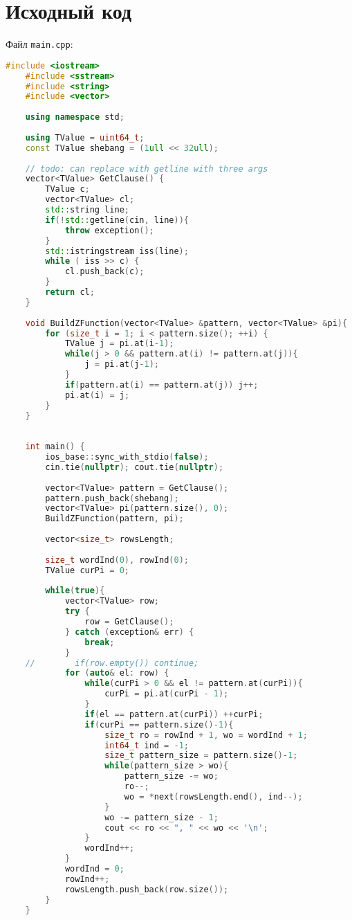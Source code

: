 \section{Исходный код}
Файл \texttt{main.cpp}:
\begin{lstlisting}[language=C++]
	#include <iostream>
	#include <sstream>
	#include <string>
	#include <vector>
	
	using namespace std;
	
	using TValue = uint64_t;
	const TValue shebang = (1ull << 32ull);
	
	// todo: can replace with getline with three args
	vector<TValue> GetClause() {
		TValue c;
		vector<TValue> cl;
		std::string line;
		if(!std::getline(cin, line)){
			throw exception();
		}
		std::istringstream iss(line);
		while ( iss >> c) {
			cl.push_back(c);
		}
		return cl;
	}
	
	void BuildZFunction(vector<TValue> &pattern, vector<TValue> &pi){
		for (size_t i = 1; i < pattern.size(); ++i) {
			TValue j = pi.at(i-1);
			while(j > 0 && pattern.at(i) != pattern.at(j)){
				j = pi.at(j-1);
			}
			if(pattern.at(i) == pattern.at(j)) j++;
			pi.at(i) = j;
		}
	}
	
	
	int main() {
		ios_base::sync_with_stdio(false);
		cin.tie(nullptr); cout.tie(nullptr);
	
		vector<TValue> pattern = GetClause();
		pattern.push_back(shebang);
		vector<TValue> pi(pattern.size(), 0);
		BuildZFunction(pattern, pi);
	
		vector<size_t> rowsLength;
	
		size_t wordInd(0), rowInd(0);
		TValue curPi = 0;
	
		while(true){
			vector<TValue> row;
			try {
				row = GetClause();
			} catch (exception& err) {
				break;
			}
	//        if(row.empty()) continue;
			for (auto& el: row) {
				while(curPi > 0 && el != pattern.at(curPi)){
					curPi = pi.at(curPi - 1);
				}
				if(el == pattern.at(curPi)) ++curPi;
				if(curPi == pattern.size()-1){
					size_t ro = rowInd + 1, wo = wordInd + 1;
					int64_t ind = -1;
					size_t pattern_size = pattern.size()-1;
					while(pattern_size > wo){
						pattern_size -= wo;
						ro--;
						wo = *next(rowsLength.end(), ind--);
					}
					wo -= pattern_size - 1;
					cout << ro << ", " << wo << '\n';
				}
				wordInd++;
			}
			wordInd = 0;
			rowInd++;
			rowsLength.push_back(row.size());
		}
	}
	
\end{lstlisting}

\pagebreak

